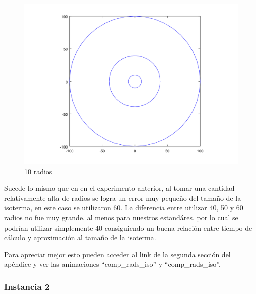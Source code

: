 \begin{figure}[H]
\begin{minipage}{0.30\textwidth}
  \centering
    \includegraphics[width=1\textwidth]{imgs/comp_rads_malo/comp_rads_iso0.png} 
	\caption{10 radios} 
  \label{fig:Radios6}
\end{minipage}
\end{figure}

Sucede lo mismo que en en el experimento anterior, al tomar una cantidad relativamente alta de radios se logra un error muy pequeño del tamaño de la isoterma, en este caso se utilizaron 60. La diferencia entre utilizar 40, 50 y 60 radios no fue muy grande, al menos para nuestros estandáres, por lo cual se podrían utilizar simplemente 40 consiguiendo un buena relación entre tiempo de cálculo y aproximación al tamaño de la isoterma.

Para apreciar mejor esto pueden acceder al link de la segunda sección del apéndice y ver las animaciones ``comp\_rads\_iso'' y ``comp\_rads\_iso''.




\subsubsection*{Instancia 2}

